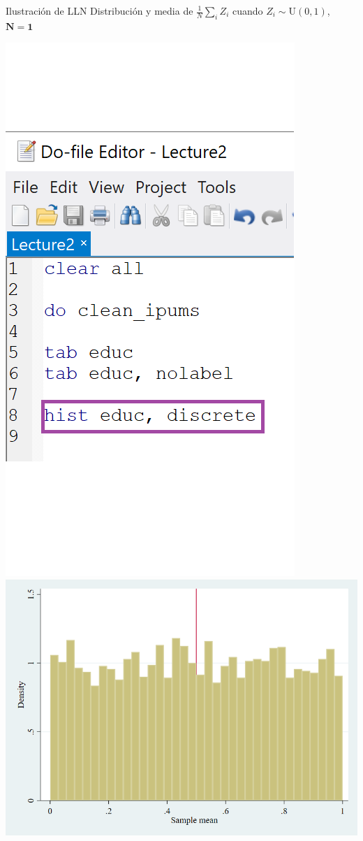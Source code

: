 \documentclass[11pt,handout,aspectratio=169]{beamer}
\begin{document}
\begin{frame}{Ilustración de LLN}
	\vspace{0.2cm}
	Distribución y media de $\frac{1}{N}\sum_i Z_i$ cuando $Z_i\sim \mathrm{U}(0,1)$, $\mathbf{N=1}$
	
	\begin{center}
		\includegraphics[scale=0.4]{Stata5.png} \includegraphics[scale=0.25]{sims1_2.png}
	\end{center}
	
\end{frame}
\end{document}

